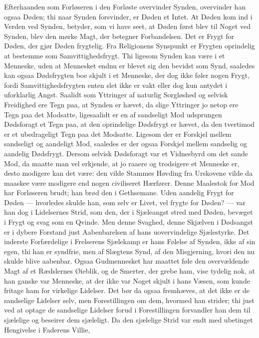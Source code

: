 \documentclass[12pt]{book}
\begin{document}
Efterhaanden som Forløseren i den Forløste overvinder Synden,
overvinder han ogsaa Døden; thi naar Synden forsvinder, er Døden et
Intet. At Døden kom ind i Verden ved Synden, betyder, som vi have
seet, at Døden først blev til Noget ved Synden, blev den mørke Magt,
der betegner Forbandelsen. Det er Frygt for Døden, der gjør Døden
frygtelig. Fra Religionens Synspunkt er Frygten oprindelig at
bestemme som Samvittighedsfrygt. Thi ligesom Synden kan være i et
Menneske, uden at Mennesket endnu er blevet sig den bevidst som
Synd, saaledes kan ogsaa Dødsfrygten boe skjult i et Menneske, der
dog ikke føler nogen Frygt, fordi Samvittighedsfrygten enten slet
ikke er vakt eller dog kun antydet i uforklarlig Angst. Saalidt som
Yttringer af naturlig Sorgløshed og selvisk Freidighed ere Tegn paa,
at Synden er hævet, da slige Yttringer jo netop ere Tegn paa det
Modsatte, ligesaalidt er en af sandseligt Mod udsprungen Dødsforagt
et Tegn paa, at den oprindelige
Dødsfrygt er hævet, da den tvertimod er et ubedrageligt Tegn paa det
Modsatte. Ligesom der er Forskjel mellem sandseligt og aandeligt
Mod, saaledes er der ogsaa Forskjel mellem sandselig og aandelig
Dødsfrygt. Dersom selvisk Dødsforagt var et Vidnesbyrd om det sande
Mod, da maatte man vel erkjende, at jo raaere og trodsigere et
Menneske er, desto modigere kan det være: den vilde Stammes Høvding
fra Urskovene vilde da maaskee være modigere end nogen civiliseret
Hærfører. Denne Maalestok for Mod har Forløseren brudt; han brød den
i Gethsemane. Uden aandelig Frygt for Døden --- hvorledes skulde
han, som selv er Livet, vel frygte for Døden? --- var han dog i
Lidelsernes Strid, som den, der i Sjæleangst stred med Døden,
bevæget i Frygt og svag som en Qvinde. Men denne Svaghed, denne
Skjælven i Dødsangst er i dybere Forstand just Aabenbarelsen af hans
uovervindelige Sjælestyrke. Det inderste Forfærdelige i Frelserens
Sjælekamp er hans Følelse af Synden, ikke af sin egen, thi han er
syndfrie, men af Slægtens Synd, af den Misgjerning, hvori den nu
skulde blive aabenbar. Ogsaa Gudmennesket har maattet føle den
overvældende Magt af et Rædslernes Øieblik, og de Smerter, der grebe
ham, vise tydelig nok, at han ganske var Menneske, at der ikke var
Noget skjult i hans Væsen, som kunde fritage ham for virkelige
Lidelser. Det bør da ogsaa fremhæves, at det ikke er de sandselige
Lidelser selv, men Forestillingen om dem, hvormed han strider; thi
just ved at optage de sandselige Lidelser forud i Forestillingen
forvandler han dem til sjælelige og beseirer dem sjæleligt. Da den
sjælelige Strid var endt med ubetinget Hengivelse i Faderens Villie,
\end{document}
